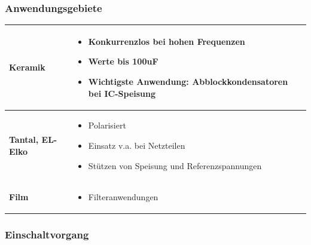 \subsubsection{Anwendungsgebiete}
\begin{longtable}{|l|l|}
\hline
\begin{minipage}{4cm}
\textbf{Keramik}
\end{minipage}
&
\begin{minipage}{6cm}
\begin{itemize}
  \item Konkurrenzlos bei hohen Frequenzen
  \item Werte bis 100uF
  \item Wichtigste Anwendung: Abblockkondensatoren bei IC-Speisung
\end{itemize}
\end{minipage}
\\
\hline
\begin{minipage}{4cm}
\textbf{Tantal, EL-Elko}
\end{minipage}
&
\begin{minipage}{6cm}
\begin{itemize}
  \item Polarisiert
  \item Einsatz v.a. bei Netzteilen
  \item Stützen von Speisung und Referenzspannungen
\end{itemize}
\end{minipage}
\\
\hline
\begin{minipage}{4cm}
\textbf{Film}
\end{minipage}
&
\begin{minipage}{6cm}
\begin{itemize}
  \item Filteranwendungen
\end{itemize}
\end{minipage}
\\
\hline
\end{longtable}
\subsubsection{Einschaltvorgang}


